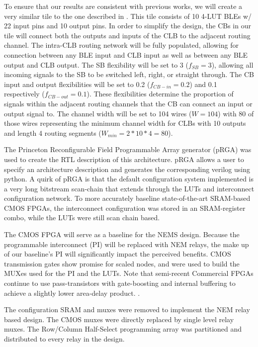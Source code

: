 \documentclass[twoside,twocolumn]{article}
\begin{document}
To ensure that our results are consistent with previous works, we
will create a very similar tile to the one described in \cite{chen_efficient_2010}. 
This tile consists of 10 4-LUT BLEs w/ 22 input pins and 10 output pins.
In order to simplify the design, the CBs in our tile will connect both
the outputs and inputs of the CLB to the adjacent routing channel.
The intra-CLB routing network will be fully populated, allowing for connection 
between any BLE input and CLB input as well as between any BLE output and CLB output.
The SB flexibility will be set to 3 ($f_{SB} = 3$), allowing all 
incoming signals to the SB to be switched left, right, or straight through. 
The CB input and output flexibilities will be set to 0.2 ($f_{CB-in} = 0.2$) 
and 0.1 respectively ($f_{CB-out} = 0.1$). These flexibilities determine the 
proportion of signals within the adjacent routing channels that the CB can 
connect an input or output signal to. The channel width will be set to 104 wires
($W=104$) with 80 of those wires representing the minimum channel width for 
CLBs with 10 outputs and length 4 routing segments ($W_{min} = 2 * 10 * 4 = 80$).

The Princeton Reconfigurable Field Programmable Array generator (pRGA) 
was used to create the RTL description of this architecture.
pRGA allows a user to specify an architecture description and 
generates the corresponding verilog using python. A quirk of 
pRGA is that the default configuration system implemented is 
a very long bitstream scan-chain that extends through the LUTs 
and interconnect configuration network. To more accurately baseline 
state-of-the-art SRAM-based CMOS FPGAs, the interconnect configuration 
was stored in an SRAM-register combo, while the LUTs were still scan chain based.

The CMOS FPGA will serve as a baseline for the NEMS design.
Because the programmable interconnect (PI) will be replaced with NEM relays, the make up
of our baseline's PI will significantly impact the perceived benefits. 
CMOS transmission gates show promise for scaled nodes, and were used to build the MUXes used 
for the PI and the LUTs. Note that semi-recent Commercial FPGAs continue to use pass-transistors with gate-boosting and internal buffering
to achieve a slightly lower area-delay product. \cite{chiasson_should_2013}.

The configuration SRAM and muxes were removed to implement the NEM relay based design. 
The CMOS muxes were directly replaced by single level relay muxes. The Row/Column Half-Select programming 
array was partitioned and distributed to every relay in the design.
\end{document}
